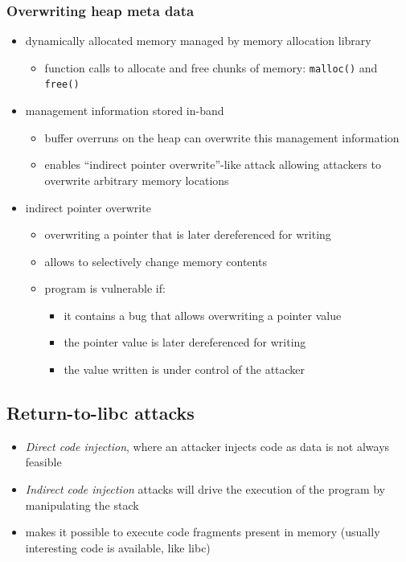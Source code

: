 \documentclass[12pt,titlepage,a4paper]{report}
\begin{document}
	\subsubsection{Overwriting heap meta data}
	\begin{itemize}
		\item dynamically allocated memory managed by memory allocation library
		\begin{itemize}
			\item function calls to allocate and free chunks of memory: \texttt{malloc()} and \texttt{free()}
		\end{itemize}
		\item management information stored in-band
		\begin{itemize}
			\item buffer overruns on the heap can overwrite this management information
			\item enables ``indirect pointer overwrite''-like attack allowing attackers to overwrite arbitrary memory locations
		\end{itemize}
	
		\item indirect pointer overwrite
		\begin{itemize}
			\item overwriting a pointer that is later dereferenced for writing
			\item allows to selectively change memory contents
			\item program is vulnerable if:
			\begin{itemize}
				\item it contains a bug that allows overwriting a pointer value
				\item the pointer value is later dereferenced for writing
				\item the value written is under control of the attacker
			\end{itemize}
		\end{itemize}
	\end{itemize}

	\subsection{Return-to-libc attacks}
	\begin{itemize}
		\item \emph{Direct code injection}, where an attacker injects code as data is not always feasible
		\item \emph{Indirect code injection} attacks will drive the execution of the program by manipulating the stack
		\item makes it possible to execute code fragments present in memory (usually interesting code is available, like libc)
	\end{itemize}
\end{document}
